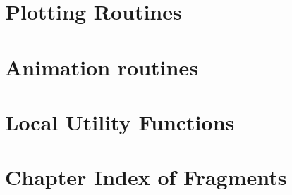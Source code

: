 \documentclass[11.5pt]{report}
\begin{document}
\section{Plotting Routines}
\section{Animation routines}



\needspace{17cm}
\section{Local Utility Functions}
\blindtext
\section{Chapter Index of Fragments}
\end{document}
